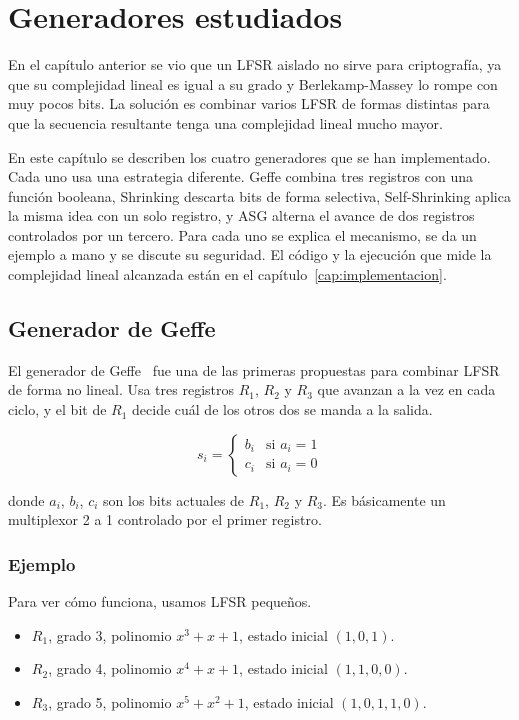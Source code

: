 \chapter{Generadores estudiados}
\label{cap:generadores}

En el capítulo anterior se vio que un LFSR aislado no sirve para criptografía,
ya que su complejidad lineal es igual a su grado y Berlekamp-Massey lo rompe con muy pocos bits.
La solución es combinar varios LFSR de formas distintas para que la secuencia resultante tenga una complejidad lineal mucho mayor.

En este capítulo se describen los cuatro generadores que se han implementado.
Cada uno usa una estrategia diferente. Geffe combina tres registros con una función booleana,
Shrinking descarta bits de forma selectiva, Self-Shrinking aplica la misma idea con un solo registro,
y ASG alterna el avance de dos registros controlados por un tercero.
Para cada uno se explica el mecanismo, se da un ejemplo a mano y se discute su seguridad.
El código y la ejecución que mide la complejidad lineal alcanzada están en el capítulo~\ref{cap:implementacion}.

\section{Generador de Geffe}
\label{sec:geffe}

El generador de Geffe~\cite{geffe1973} fue una de las primeras propuestas para combinar LFSR de forma no lineal.
Usa tres registros $R_1$, $R_2$ y $R_3$ que avanzan a la vez en cada ciclo, y el bit de $R_1$ decide cuál de los otros dos se manda a la salida.

\[
  s_i = \begin{cases} b_i & \text{si } a_i = 1 \\ c_i & \text{si } a_i = 0 \end{cases}
\]

donde $a_i$, $b_i$, $c_i$ son los bits actuales de $R_1$, $R_2$ y $R_3$. Es básicamente un multiplexor 2 a 1 controlado por el primer registro.

\subsection{Ejemplo}

Para ver cómo funciona, usamos LFSR pequeños.

\begin{itemize}
  \item $R_1$, grado 3, polinomio $x^3 + x + 1$, estado inicial $(1, 0, 1)$.
  \item $R_2$, grado 4, polinomio $x^4 + x + 1$, estado inicial $(1, 1, 0, 0)$.
  \item $R_3$, grado 5, polinomio $x^5 + x^2 + 1$, estado inicial $(1, 0, 1, 1, 0)$.
\end{itemize}

